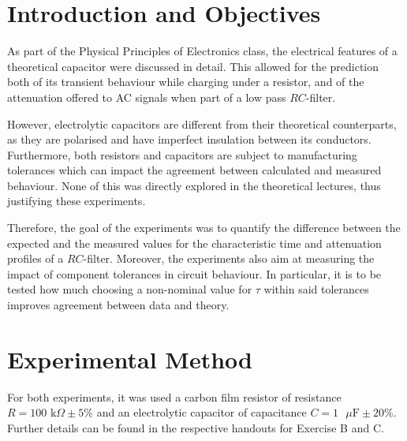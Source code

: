\documentclass{article}
\begin{document}
\captionsetup{font=small}
\newcommand{\Vout}{V_{\text{out}}}
\newcommand{\Vin}{V_{\text{in}}}
\newcommand{\Vusb}{V_{\text{USB}}}
\newcommand{\vout}{v_{\text{out}}}
\newcommand{\Vmax}{V_{\text{max}}}
\newcommand{\vin}{v_{\text{in}}}
\newcommand{\vinr}{v_{\text{in}}^{\text{RMS}}}
\newcommand{\voutr}{v_{\text{out}}^{\text{RMS}}}
\newcommand{\td}{t_\text{d}}

\section{Introduction and Objectives}
As part of the Physical Principles of Electronics class, the electrical features of a theoretical capacitor were discussed in detail. This allowed for the prediction both of its transient behaviour while charging under a resistor, and of the attenuation offered to AC signals when part of a low pass $RC$-filter.
\par However, electrolytic capacitors are different from their theoretical counterparts, as they are polarised and have imperfect insulation between its conductors. Furthermore, both resistors and capacitors are subject to manufacturing tolerances which can impact the agreement between calculated and measured behaviour. None of this was directly explored in the theoretical lectures, thus justifying these experiments.
\par Therefore, the goal of the experiments was to quantify the difference between the expected and the measured values for the characteristic time and attenuation profiles of a $RC$-filter. Moreover, the experiments also aim at measuring the impact of component tolerances in circuit behaviour. In particular, it is to be tested how much choosing a non-nominal value for $\tau$ within said tolerances improves agreement between data and theory.
\section{Experimental Method}
For both experiments, it was used a carbon film resistor of resistance $R = 100 \text{ k}\Omega \pm 5\%$ and an electrolytic capacitor of capacitance $C = 1 \text{ }\mu\text{F} \pm 20\%$. Further details can be found in the respective handouts for Exercise B and C.
\end{document}
